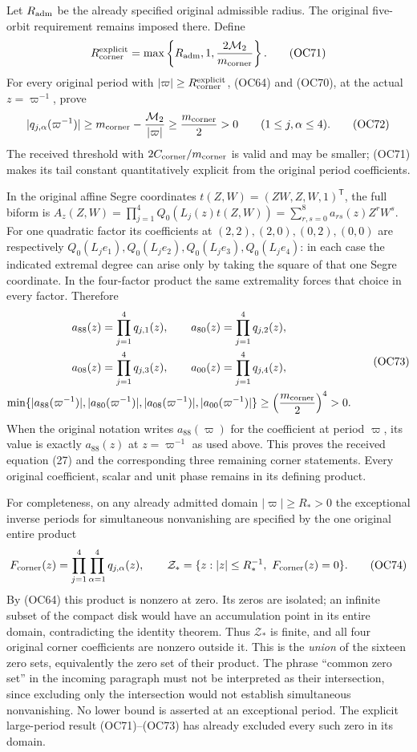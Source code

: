 \documentclass[11pt]{article}
\theoremstyle{remark}\newtheorem{remark}[theorem]{Remark}
\begin{document}
Let $R_{\rm adm}$ be the already specified original admissible radius.
The original five-orbit requirement remains imposed there. Define
\[
 R_{\rm corner}^{\rm explicit}
   =\max\left\{R_{\rm adm},1,
                      \frac{2\mathcal M_2}{m_{\rm corner}}\right\}.
 \tag{OC71}\label{eq:OC71}
\]
For every original period with $|\varpi|\ge
R_{\rm corner}^{\rm explicit}$, (OC64) and (OC70), at the actual
$z=\varpi^{-1}$, prove
\[
 |q_{j,\alpha}(\varpi^{-1})|
 \ge m_{\rm corner}-\frac{\mathcal M_2}{|\varpi|}
 \ge\frac{m_{\rm corner}}2>0
            \qquad(1\le j,\alpha\le4).
 \tag{OC72}\label{eq:OC72}
\]
The received threshold with $2C_{\rm corner}/m_{\rm corner}$ is
valid and may be smaller; (OC71) makes its tail constant quantitatively
explicit from the original period coefficients.

In the original affine Segre coordinates $t(Z,W)=(ZW,Z,W,1)^{\mathsf T}$,
the full biform is
$A_z(Z,W)=\prod_{j=1}^4Q_0(L_j(z)t(Z,W))
 =\sum_{r,s=0}^8a_{rs}(z)Z^rW^s$.
For one quadratic factor its coefficients at $(2,2),(2,0),(0,2),(0,0)$
are respectively $Q_0(L_je_1),Q_0(L_je_2),Q_0(L_je_3),Q_0(L_je_4)$:
in each case the indicated extremal degree can arise only by taking the
square of that one Segre coordinate. In the four-factor product the
same extremality forces that choice in every factor. Therefore
\[
 \begin{gathered}
 a_{88}(z)=\prod_{j=1}^4q_{j,1}(z),\qquad
 a_{80}(z)=\prod_{j=1}^4q_{j,2}(z),\\
 a_{08}(z)=\prod_{j=1}^4q_{j,3}(z),\qquad
 a_{00}(z)=\prod_{j=1}^4q_{j,4}(z),\\
 \min\{|a_{88}(\varpi^{-1})|,|a_{80}(\varpi^{-1})|,
          |a_{08}(\varpi^{-1})|,|a_{00}(\varpi^{-1})|\}
       \ge\left(\frac{m_{\rm corner}}2\right)^4>0.
 \end{gathered}\tag{OC73}\label{eq:OC73}
\]
When the original notation writes $a_{88}(\varpi)$ for the coefficient
at period $\varpi$, its value is exactly $a_{88}(z)$ at
$z=\varpi^{-1}$ as used above. This proves the received equation (27)
and the corresponding three remaining corner statements. Every original
coefficient, scalar and unit phase remains in its defining product.

For completeness, on any already admitted domain $|\varpi|\ge R_*>0$
the exceptional inverse periods for simultaneous nonvanishing are
specified by the one original entire product
\[
 F_{\rm corner}(z)=\prod_{j=1}^4\prod_{\alpha=1}^4q_{j,\alpha}(z),
 \qquad
 \mathcal Z_*=
 \{z:|z|\le R_*^{-1},\ F_{\rm corner}(z)=0\}.
 \tag{OC74}\label{eq:OC74}
\]
By (OC64) this product is nonzero at zero. Its zeros are isolated;
an infinite subset of the compact disk would have an accumulation point
in its entire domain, contradicting the identity theorem. Thus
$\mathcal Z_*$ is finite, and all four original corner coefficients
are nonzero outside it. This is the \emph{union} of the sixteen
zero sets, equivalently the zero set of their product. The phrase
``common zero set'' in the incoming paragraph must not be interpreted as
their intersection, since excluding only the intersection would not
establish simultaneous nonvanishing. No lower bound is asserted at an
exceptional period. The explicit large-period result (OC71)--(OC73)
has already excluded every such zero in its domain.
\end{document}
